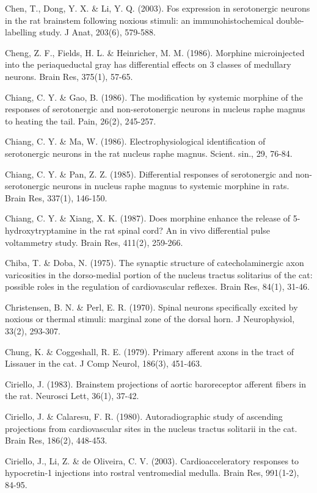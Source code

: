 \documentclass[a4paper,12pt,twoside]{report}
\begin{document}
\begin{singlespacing}
\begin{footnotesize}
Chen, T., Dong, Y. X. \& Li, Y. Q. (2003). Fos expression in serotonergic neurons in the rat brainstem following noxious stimuli: an immunohistochemical double-labelling study. J Anat, 203(6), 579-588.

Cheng, Z. F., Fields, H. L. \& Heinricher, M. M. (1986). Morphine microinjected into the periaqueductal gray has differential effects on 3 classes of medullary neurons. Brain Res, 375(1), 57-65.

Chiang, C. Y. \& Gao, B. (1986). The modification by systemic morphine of the responses of serotonergic and non-serotonergic neurons in nucleus raphe magnus to heating the tail. Pain, 26(2), 245-257.

Chiang, C. Y. \& Ma, W. (1986). Electrophysiological identification of serotonergic neurons in the rat nucleus raphe magnus. Scient. sin., 29, 76-84.

Chiang, C. Y. \& Pan, Z. Z. (1985). Differential responses of serotonergic and non-serotonergic neurons in nucleus raphe magnus to systemic morphine in rats. Brain Res, 337(1), 146-150.

Chiang, C. Y. \& Xiang, X. K. (1987). Does morphine enhance the release of 5-hydroxytryptamine in the rat spinal cord? An in vivo differential pulse voltammetry study. Brain Res, 411(2), 259-266.

Chiba, T. \& Doba, N. (1975). The synaptic structure of catecholaminergic axon varicosities in the dorso-medial portion of the nucleus tractus solitarius of the cat: possible roles in the regulation of cardiovascular reflexes. Brain Res, 84(1), 31-46.

Christensen, B. N. \& Perl, E. R. (1970). Spinal neurons specifically excited by noxious or thermal stimuli: marginal zone of the dorsal horn. J Neurophysiol, 33(2), 293-307.

Chung, K. \& Coggeshall, R. E. (1979). Primary afferent axons in the tract of Lissauer in the cat. J Comp Neurol, 186(3), 451-463.

Ciriello, J. (1983). Brainstem projections of aortic baroreceptor afferent fibers in the rat. Neurosci Lett, 36(1), 37-42.

Ciriello, J. \& Calaresu, F. R. (1980). Autoradiographic study of ascending projections from cardiovascular sites in the nucleus tractus solitarii in the cat. Brain Res, 186(2), 448-453.

Ciriello, J., Li, Z. \& de Oliveira, C. V. (2003). Cardioacceleratory responses to hypocretin-1 injections into rostral ventromedial medulla. Brain Res, 991(1-2), 84-95.


\end{footnotesize}
\end{singlespacing}
\end{document}
